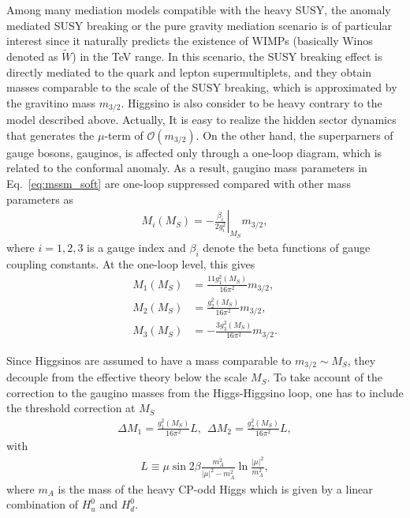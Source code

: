 \documentclass[12pt,twoside,book]{article}
\begin{document}
Among many mediation models compatible with the heavy SUSY, the anomaly mediated SUSY breaking \cite{Giudice:1998xp, Randall:1998uk} or the pure gravity mediation scenario \cite{Ibe:2006de, Ibe:2011aa, ArkaniHamed:2012gw} is of particular interest since it naturally predicts the existence of WIMPs (basically Winos denoted as $\tilde{W}$) in the TeV range.
In this scenario, the SUSY breaking effect is directly mediated to the quark and lepton supermultiplets, and they obtain masses comparable to the scale of the SUSY breaking, which is approximated by the gravitino mass $m_{3/2}$.
Higgsino is also consider to be heavy contrary to the model described above.
Actually, It is easy to realize the hidden sector dynamics that generates the $\mu$-term of $\mathcal{O} (m_{3/2})$.
On the other hand, the superparners of gauge bosons, gauginos, is affected only through a one-loop diagram, which is related to the conformal anomaly.
As a result, gaugino mass parameters in Eq.~\eqref{eq:mssm_soft} are one-loop suppressed compared with other mass parameters as
\begin{align}
  M_i (M_S) = -\left. \frac{\beta_i}{2 g_i^2} \right|_{M_S} m_{3/2},
\end{align}
where $i=1,2,3$ is a gauge index and $\beta_i$ denote the beta functions of gauge coupling constants.
At the one-loop level, this gives
\begin{align}
  M_1 (M_S) &= \frac{11 g_1^2 (M_S)}{16 \pi^2} m_{3/2},\\
  M_2 (M_S) &= \frac{g_2^2 (M_S)}{16 \pi^2} m_{3/2},\\
  M_3 (M_S) &= -\frac{3 g_3^2 (M_S)}{16 \pi^2} m_{3/2}.
\end{align}

Since Higgsinos are assumed to have a mass comparable to $m_{3/2} \sim M_S$, they decouple from the effective theory below the scale $M_S$.
To take account of the correction to the gaugino masses from the Higgs-Higgsino loop, one has to include the threshold correction at $M_S$
\begin{align}
  \Delta M_1 = \frac{g_1^2 (M_S)}{16\pi^2} L,
  ~~
  \Delta M_2 = \frac{g_2^2 (M_S)}{16\pi^2} L,
\end{align}
with
\begin{align}
  L \equiv \mu \sin 2\beta \frac{m_A^2}{|\mu|^2 - m_A^2} \ln \frac{|\mu|^2}{m_A^2},
\end{align}
where $m_A$ is the mass of the heavy CP-odd Higgs which is given by a linear combination of $H_u^0$ and $H_d^0$.
\end{document}
